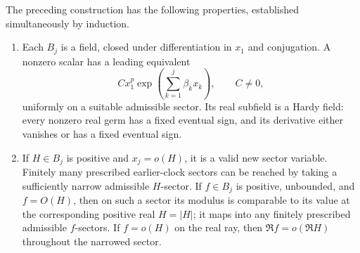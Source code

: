 \begin{lemma}\label{path:clock}
The preceding construction has the following properties, established
simultaneously by induction.
\begin{enumerate}[label=\textup{(\alph*)}]
\item Each \(B_j\) is a field, closed under differentiation in \(x_1\)
and conjugation.  A nonzero scalar has a leading equivalent
\begin{equation}\label{path:eq-leading-monomial}
 Cx_1^p\exp\!\left(\sum_{k=1}^j\beta_kx_k\right),
 \qquad C\ne0,
\end{equation}
uniformly on a suitable admissible sector.  Its real subfield is a Hardy
field: every nonzero real germ has a fixed eventual sign, and its
derivative either vanishes or has a fixed eventual sign.
\item If \(H\in B_j\) is positive and \(x_j=o(H)\), it is a valid
new sector variable.  Finitely many prescribed earlier-clock sectors
can be reached by taking a sufficiently narrow admissible \(H\)-sector.
If \(f\in B_j\) is positive, unbounded, and \(f=O(H)\), then on such
a sector its modulus is comparable to its value at the corresponding
positive real \(H=|H|\); it maps into any finitely prescribed
admissible \(f\)-sectors.  If \(f=o(H)\) on the real ray, then
\(\Re f=o(\Re H)\) throughout the narrowed sector.
\end{enumerate}
\end{lemma}

